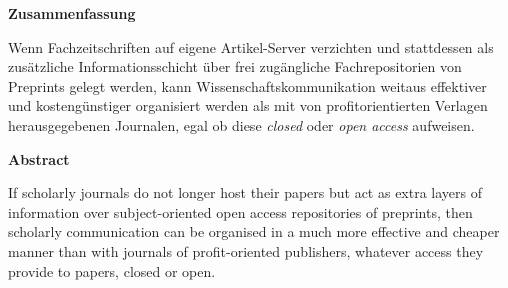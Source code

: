 \textbf{Zusammenfassung}

Wenn Fachzeitschriften auf eigene Artikel-Server verzichten und
stattdessen als zusätzliche Informationsschicht über frei zugängliche
Fachrepositorien von Preprints gelegt werden, kann
Wissenschaftskommunikation weitaus effektiver und kostengünstiger
organisiert werden als mit von profitorientierten Verlagen
herausgegebenen Journalen, egal ob diese \emph{closed} oder \emph{open
access} aufweisen.

\textbf{Abstract}

If scholarly journals do not longer host their papers but act as extra
layers of information over subject-oriented open access repositories of
preprints, then scholarly communication can be organised in a much more
effective and cheaper manner than with journals of profit-oriented
publishers, whatever access they provide to papers, closed or open.
